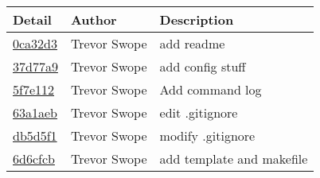\begin{tabular}{l l l}\textbf{Detail} & \textbf{Author} & \textbf{Description}\\\hline
\href{https://github.com/swopet/group16/commit/0ca32d3c9bb6e2ea87803bf2c1cedf9eced6cd88}{0ca32d3} & Trevor Swope & add readme\\\hline
\href{https://github.com/swopet/group16/commit/37d77a92bf5028137198c069a368434ea934e86b}{37d77a9} & Trevor Swope & add config stuff\\\hline
\href{https://github.com/swopet/group16/commit/5f7e1128983e84e7e80820817dc29c565faef752}{5f7e112} & Trevor Swope & Add command log\\\hline
\href{https://github.com/swopet/group16/commit/63a1aeb7a92fb6a74ef7c9a843fc9b95a72b4521}{63a1aeb} & Trevor Swope & edit .gitignore\\\hline
\href{https://github.com/swopet/group16/commit/db5d5f1394d2bae164a8aaffed3f9acb790090ed}{db5d5f1} & Trevor Swope & modify .gitignore\\\hline
\href{https://github.com/swopet/group16/commit/6d6cfcbee9bc5d8ec624fa8802d2a87c8de60433}{6d6cfcb} & Trevor Swope & add template and makefile\\\hline\end{tabular}
